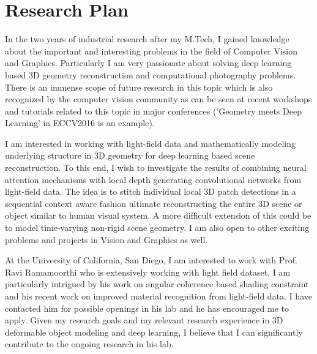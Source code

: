 \documentclass{article}
\begin{document}
	
	\vspace*{-0.25cm}
	\section{Research Plan}
	\vspace*{-0.25cm}
	In the two years of industrial research after my M.Tech, I gained knowledge about the important and interesting problems in the field of Computer Vision and Graphics. Particularly I am very passionate about solving deep learning based 3D geometry reconstruction and computational photography problems. There is an immense scope of future research in this topic which is also recognized by the computer vision community as can be seen at recent workshops and tutorials related to this topic in major conferences ('Geometry meets Deep Learning' in ECCV2016 is an example). 
	
	\vspace{0.1cm}
	
	I am interested in working with light-field data and mathematically modeling underlying structure in 3D geometry for deep learning based scene reconstruction. To this end, I wish to investigate the results of combining neural attention mechanisms with local depth generating convolutional networks from light-field data. The idea is to stitch individual local  3D patch detections in a sequential context aware fashion ultimate reconstructing the entire 3D scene or object similar to human visual system. A more difficult extension of this could be to model time-varying non-rigid scene geometry. I am also open to other exciting problems and projects in Vision and Graphics as well.
	
	\vspace{0.1cm}
	
	At the University of California, San Diego, I am interested to work with Prof. Ravi Ramamoorthi who is extensively working with light field dataset. I am particularly intrigued by his work on angular coherence based shading constraint and his recent work on improved material recognition from light-field data. I have contacted him for possible openings in his lab and he has encouraged me to apply. Given my research goals and my relevant research experience in 3D deformable object modeling and deep learning, I believe that I can significantly contribute to the ongoing research in his lab.
	
\end{document}
